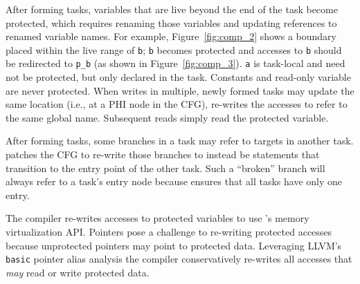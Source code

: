 After forming tasks, variables that are live beyond the end of the task become
protected, which requires renaming those variables and updating references to
renamed variable names.  
%
For example, Figure~\ref{fig:comp_2} shows a boundary placed within the live
range of {\tt b}; {\tt b} becomes protected and accesses to {\tt b} should be
redirected to {\tt p\_b} (as shown in Figure~\ref{fig:comp_3}).  {\tt a} is
task-local and need not be protected, but only declared in the task. Constants
and read-only variable are never protected.
%
When writes in multiple, newly formed tasks may update the same location (i.e.,
at a PHI node in the CFG), \sys re-writes the accesses to refer to the same global
name.   Subsequent reads simply read the protected variable. 

After forming tasks, some branches in a task may refer to targets in another
task. \sys patches the CFG to re-write those branches to instead be \transition
statements that transition to the entry point of the other task. Such a
``broken'' branch will always refer to a task's entry node because \sys ensures
that all tasks have only one entry. 

The compiler re-writes accesses to protected variables to use \sys's memory
virtualization API. Pointers pose a challenge to re-writing protected accesses
because unprotected pointers may point to protected data.  Leveraging LLVM's
{\tt basic} pointer alias analysis the compiler conservatively re-writes all
accesses that {\em may} read or write protected data. 




